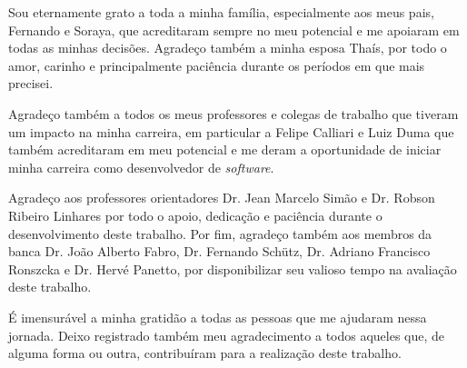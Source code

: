 
\begin{agradecimentos}%

Sou eternamente grato a toda a minha família, especialmente aos meus pais,
Fernando e Soraya, que acreditaram sempre no meu potencial e me apoiaram em
todas as minhas decisões. Agradeço também a minha esposa Thaís, por todo o amor,
carinho e principalmente paciência durante os períodos em que mais precisei.

Agradeço também a todos os meus professores e colegas de trabalho que tiveram um
impacto na minha carreira, em particular a Felipe Calliari e Luiz Duma que
também acreditaram em meu potencial e me deram a oportunidade de iniciar minha
carreira como desenvolvedor de \textit{software}.

Agradeço aos professores orientadores Dr. Jean Marcelo Simão e Dr. Robson
Ribeiro Linhares por todo o apoio, dedicação e paciência durante o
desenvolvimento deste trabalho. Por fim, agradeço também aos membros da banca Dr. João
Alberto Fabro, Dr. Fernando Schütz, Dr. Adriano Francisco Ronszcka e Dr. Hervé Panetto, por
disponibilizar seu valioso tempo na avaliação deste trabalho.

É imensurável a minha gratidão a todas as pessoas que me ajudaram nessa jornada.
Deixo registrado também meu agradecimento a todos aqueles que, de alguma forma
ou outra, contribuíram para a realização deste trabalho.
\end{agradecimentos}
